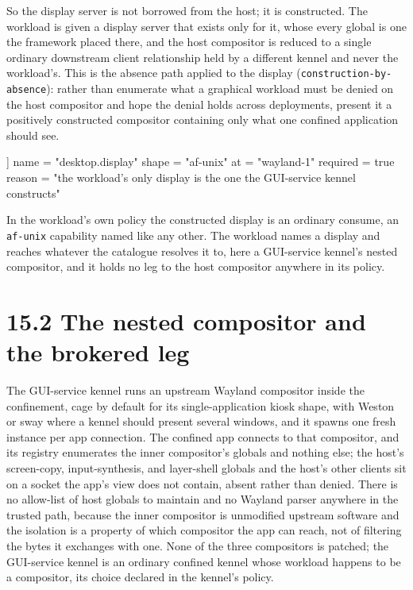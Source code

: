 So the display server is not borrowed from the host; it is constructed.
The workload is given a display server that exists only for it, whose
every global is one the framework placed there, and the host compositor
is reduced to a single ordinary downstream client relationship held by a
different kennel and never the workload's. This is the absence path
applied to the display (\texttt{construction-by-absence}): rather than
enumerate what a graphical workload must be denied on the host
compositor and hope the denial holds across deployments, present it a
positively constructed compositor containing only what one confined
application should see.

\begin{kennelcode}
[[consumes]]
name = "desktop.display"
shape = "af-unix"
at = "wayland-1"
required = true
reason = "the workload's only display is the one the GUI-service kennel constructs"
\end{kennelcode}

In the workload's own policy the constructed display is an ordinary
consume, an \texttt{af-unix} capability named like any other. The
workload names a display and reaches whatever the catalogue resolves it
to, here a GUI-service kennel's nested compositor, and it holds no leg
to the host compositor anywhere in its policy.

\hypertarget{the-nested-compositor-and-the-brokered-leg}{%
\section{15.2 The nested compositor and the brokered
leg}\label{the-nested-compositor-and-the-brokered-leg}}

The GUI-service kennel runs an upstream Wayland compositor inside the
confinement, cage by default for its single-application kiosk shape,
with Weston or sway where a kennel should present several windows, and
it spawns one fresh instance per app connection. The confined app
connects to that compositor, and its registry enumerates the inner
compositor's globals and nothing else; the host's screen-copy,
input-synthesis, and layer-shell globals and the host's other clients
sit on a socket the app's view does not contain, absent rather than
denied. There is no allow-list of host globals to maintain and no
Wayland parser anywhere in the trusted path, because the inner
compositor is unmodified upstream software and the isolation is a
property of which compositor the app can reach, not of filtering the
bytes it exchanges with one. None of the three compositors is patched;
the GUI-service kennel is an ordinary confined kennel whose workload
happens to be a compositor, its choice declared in the kennel's policy.

